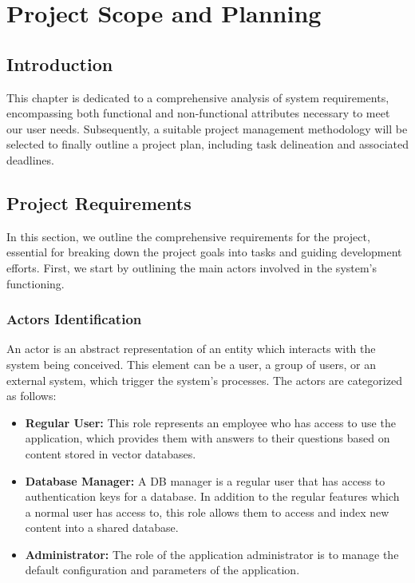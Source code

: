 \chapter{Project Scope and Planning}

\section{Introduction}
This chapter is dedicated to a comprehensive analysis of system requirements, encompassing both functional and non-functional attributes necessary to meet our user needs. Subsequently, a suitable project management methodology will be selected to finally outline a project plan, including task delineation and associated deadlines.

\section{Project Requirements}
In this section, we outline the comprehensive requirements for the project, essential for breaking down the project goals into tasks and guiding development efforts.\newline
First, we start by outlining the main actors involved in the system's functioning.
\subsection{Actors Identification}
An actor is an abstract representation of an entity which interacts with the system being conceived. This element can be a user, a group of users, or an external system, which trigger the system's processes.\newline
The actors are categorized as follows:
\begin{itemize}
    \item \textbf{Regular User:} This role represents an employee who has access to use the application, which provides them with answers to their questions based on content stored in vector databases.
    \item \textbf{Database Manager:} A DB manager is a regular user that has access to authentication keys for a database. In addition to the regular features which a normal user has access to, this role allows them to access and index new content into a shared database.
    \item \textbf{Administrator:} The role of the application administrator is to manage the default configuration and parameters of the application.
\end{itemize}
